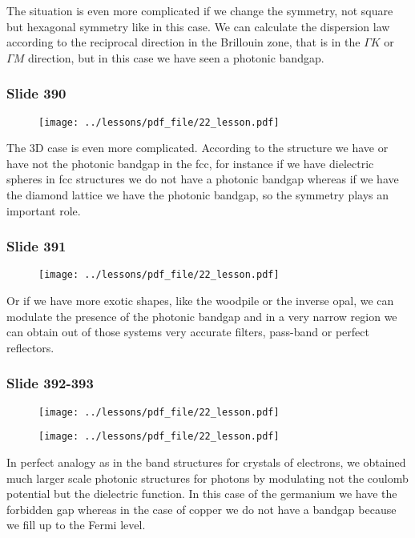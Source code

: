 \documentclass[../main/main.tex]{subfiles}
\begin{document}
The situation is even more complicated if we change the symmetry, not square but hexagonal symmetry like in this case. We can calculate the dispersion law according to the reciprocal direction in the Brillouin zone, that is in the $\Gamma K$ or $\Gamma M$ direction, but in this case we have seen a photonic bandgap.

\newpage

\subsubsection{Slide 390}

\begin{figure}[h!]
\centering
\texttt{[image: ../lessons/pdf\_file/22\_lesson.pdf]}
\end{figure}

The 3D case is even more complicated. According to the structure we have or have not the photonic bandgap in the fcc, for instance if we have dielectric spheres in fcc structures we do not have a photonic bandgap whereas if we have the diamond lattice we have the photonic bandgap, so the symmetry plays an important role.

\newpage

\subsubsection{Slide 391}

\begin{figure}[h!]
\centering
\texttt{[image: ../lessons/pdf\_file/22\_lesson.pdf]}
\end{figure}

Or if we have more exotic shapes, like the woodpile or the inverse opal, we can modulate the presence of the photonic bandgap and in a very narrow region we can obtain out of those systems very accurate filters, pass-band or perfect reflectors.

\newpage

\subsubsection{Slide 392-393}

\begin{figure}[h!]
\centering
\texttt{[image: ../lessons/pdf\_file/22\_lesson.pdf]}
\end{figure}

\begin{figure}[h!]
\centering
\texttt{[image: ../lessons/pdf\_file/22\_lesson.pdf]}
\end{figure}

\newpage

In perfect analogy as in the band structures for crystals of electrons, we obtained much larger scale photonic structures for photons by modulating not the coulomb potential but the dielectric function. In this case of the germanium we have the forbidden gap whereas in the case of copper we do not have a bandgap because we fill up to the Fermi level.

\clearpage
\end{document}
